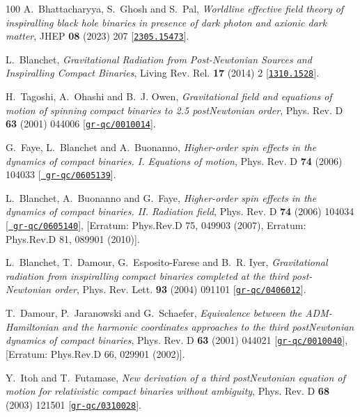 \begin{thebibliography}{100}
A.~Bhattacharyya, S.~Ghosh and S.~Pal,  {\em {Worldline effective field theory
  of inspiralling black hole binaries in presence of dark photon and axionic
  dark matter}}, JHEP {\bf 08} (2023) 207
  [\href{http://www.arXiv.org/abs/2305.15473}{{\tt 2305.15473}}].

L.~Blanchet,  {\em {Gravitational Radiation from Post-Newtonian Sources and
  Inspiralling Compact Binaries}}, Living Rev. Rel. {\bf 17} (2014) 2
  [\href{http://www.arXiv.org/abs/1310.1528}{{\tt 1310.1528}}].

H.~Tagoshi, A.~Ohashi and B.~J. Owen,  {\em {Gravitational field and equations
  of motion of spinning compact binaries to 2.5 postNewtonian order}}, Phys.
  Rev. D {\bf 63} (2001) 044006
  [\href{http://www.arXiv.org/abs/gr-qc/0010014}{{\tt gr-qc/0010014}}].

G.~Faye, L.~Blanchet and A.~Buonanno,  {\em {Higher-order spin effects in the
  dynamics of compact binaries. I. Equations of motion}}, Phys. Rev. D {\bf 74}
  (2006) 104033 [\href{http://www.arXiv.org/abs/gr-qc/0605139}{{\tt
  gr-qc/0605139}}].

L.~Blanchet, A.~Buonanno and G.~Faye,  {\em {Higher-order spin effects in the
  dynamics of compact binaries. II. Radiation field}}, Phys. Rev. D {\bf 74}
  (2006) 104034 [\href{http://www.arXiv.org/abs/gr-qc/0605140}{{\tt
  gr-qc/0605140}}], [Erratum: Phys.Rev.D 75, 049903 (2007), Erratum: Phys.Rev.D
  81, 089901 (2010)].

L.~Blanchet, T.~Damour, G.~Esposito-Farese and B.~R. Iyer,  {\em {Gravitational
  radiation from inspiralling compact binaries completed at the third
  post-Newtonian order}}, Phys. Rev. Lett. {\bf 93} (2004) 091101
  [\href{http://www.arXiv.org/abs/gr-qc/0406012}{{\tt gr-qc/0406012}}].

T.~Damour, P.~Jaranowski and G.~Schaefer,  {\em {Equivalence between the
  ADM-Hamiltonian and the harmonic coordinates approaches to the third
  postNewtonian dynamics of compact binaries}}, Phys. Rev. D {\bf 63} (2001)
  044021 [\href{http://www.arXiv.org/abs/gr-qc/0010040}{{\tt gr-qc/0010040}}],
  [Erratum: Phys.Rev.D 66, 029901 (2002)].

Y.~Itoh and T.~Futamase,  {\em {New derivation of a third postNewtonian
  equation of motion for relativistic compact binaries without ambiguity}},
  Phys. Rev. D {\bf 68} (2003) 121501
  [\href{http://www.arXiv.org/abs/gr-qc/0310028}{{\tt gr-qc/0310028}}].


\end{thebibliography}
